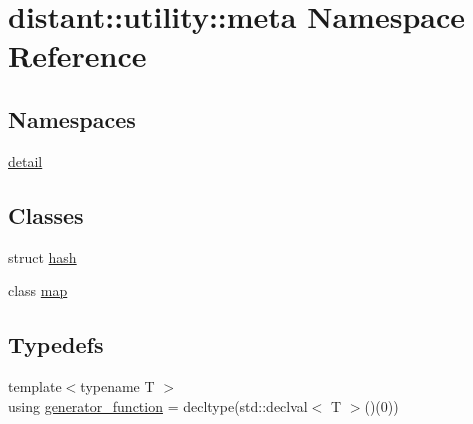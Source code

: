 \hypertarget{namespacedistant_1_1utility_1_1meta}{}\section{distant\+:\+:utility\+:\+:meta Namespace Reference}
\label{namespacedistant_1_1utility_1_1meta}
\subsection*{Namespaces}
\begin{DoxyCompactItemize}
\item 
 \mbox{\hyperlink{namespacedistant_1_1utility_1_1meta_1_1detail}{detail}}
\end{DoxyCompactItemize}
\subsection*{Classes}
\begin{DoxyCompactItemize}
\item 
struct \mbox{\hyperlink{structdistant_1_1utility_1_1meta_1_1hash}{hash}}
\item 
class \mbox{\hyperlink{classdistant_1_1utility_1_1meta_1_1map}{map}}
\end{DoxyCompactItemize}
\subsection*{Typedefs}
\begin{DoxyCompactItemize}
\item 
{\footnotesize template$<$typename T $>$ }\\using \mbox{\hyperlink{namespacedistant_1_1utility_1_1meta_a61f75cfe650b1bcb71aa5ab01299936d}{generator\+\_\+function}} = decltype(std\+::declval$<$ T $>$()(0))
\end{DoxyCompactItemize}

